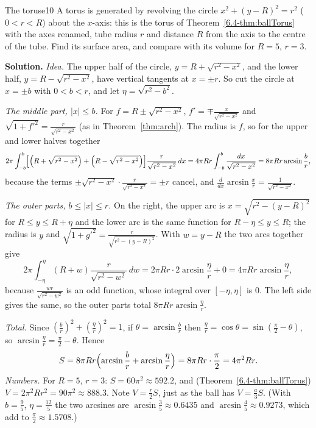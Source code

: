 \documentclass[11pt]{article}
\begin{document}
\begin{exmp}{The torus}{e10}
A torus is generated by revolving the circle $x^2+(y-R)^2=r^2$ ($0<r<R$) about the $x$-axis: this is the torus of Theorem~\ref{6.4-thm:ballTorus} with the axes renamed, tube radius $r$ and distance $R$ from the axis to the centre of the tube. Find its surface area, and compare with its volume for $R=5$, $r=3$.

\textbf{Solution.} \emph{Idea.} The upper half of the circle, $y=R+\sqrt{r^2-x^2}$, and the lower half, $y=R-\sqrt{r^2-x^2}$, have vertical tangents at $x=\pm r$. So cut the circle at $x=\pm b$ with $0<b<r$, and let $\eta=\sqrt{r^2-b^2}$.

\emph{The middle part, $\lvert x\rvert\le b$.} For $f=R\pm\sqrt{r^2-x^2}$, $f'=\mp\frac{x}{\sqrt{r^2-x^2}}$ and $\sqrt{1+f'^2}=\frac r{\sqrt{r^2-x^2}}$ (as in Theorem~\ref{thm:arch}). The radius is $f$, so for the upper and lower halves together
\[
2\pi\int_{-b}^{b}\Bigl[\Bigl(R+\sqrt{r^2-x^2}\Bigr)+\Bigl(R-\sqrt{r^2-x^2}\Bigr)\Bigr]\frac r{\sqrt{r^2-x^2}}\,dx=4\pi Rr\int_{-b}^b\frac{dx}{\sqrt{r^2-x^2}}=8\pi Rr\arcsin\frac br ,
\]
because the terms $\pm\sqrt{r^2-x^2}\cdot\frac r{\sqrt{r^2-x^2}}=\pm r$ cancel, and $\frac d{dx}\arcsin\frac xr=\frac1{\sqrt{r^2-x^2}}$.

\emph{The outer parts, $b\le\lvert x\rvert\le r$.} On the right, the upper arc is $x=\sqrt{r^2-(y-R)^2}$ for $R\le y\le R+\eta$ and the lower arc is the same function for $R-\eta\le y\le R$; the radius is $y$ and $\sqrt{1+g'^2}=\frac r{\sqrt{r^2-(y-R)^2}}$. With $w=y-R$ the two arcs together give
\[
2\pi\int_{-\eta}^{\eta}(R+w)\frac r{\sqrt{r^2-w^2}}\,dw=2\pi Rr\cdot2\arcsin\frac\eta r+0=4\pi Rr\arcsin\frac\eta r ,
\]
because $\frac{wr}{\sqrt{r^2-w^2}}$ is an odd function, whose integral over $[-\eta,\eta]$ is $0$. The left side gives the same, so the outer parts total $8\pi Rr\arcsin\frac\eta r$.

\emph{Total.} Since $(\frac br)^2+(\frac\eta r)^2=1$, if $\theta=\arcsin\frac br$ then $\frac\eta r=\cos\theta=\sin(\frac\pi2-\theta)$, so $\arcsin\frac\eta r=\frac\pi2-\theta$. Hence
\[
S=8\pi Rr\Bigl(\arcsin\frac br+\arcsin\frac\eta r\Bigr)=8\pi Rr\cdot\frac\pi2=4\pi^2Rr .
\]
\emph{Numbers.} For $R=5$, $r=3$: $S=60\pi^2\approx592.2$, and (Theorem~\ref{6.4-thm:ballTorus}) $V=2\pi^2Rr^2=90\pi^2\approx888.3$. Note $V=\frac r2S$, just as the ball has $V=\frac a3S$. (With $b=\frac95$, $\eta=\frac{12}5$ the two arcsines are $\arcsin\frac35\approx0.6435$ and $\arcsin\frac45\approx0.9273$, which add to $\frac\pi2\approx1.5708$.)


\end{exmp}
\end{document}
